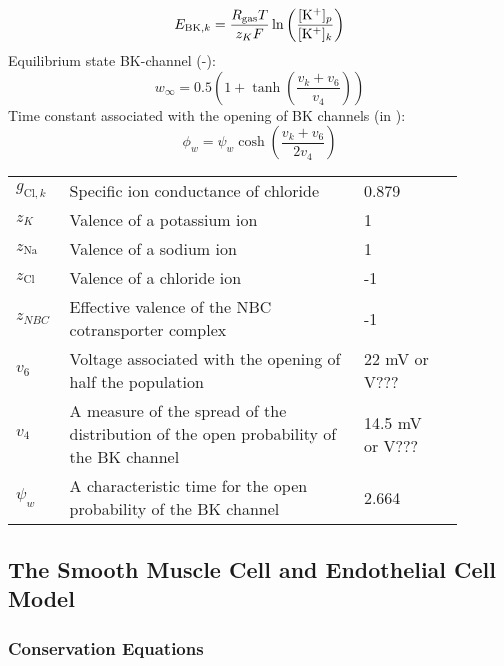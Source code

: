 \begin{equation} \label{eq:E_BK}
E_{\text{BK},k} = \frac{R_{\text{gas}} T}{z_K F}\ln\left( \frac{[\text{K$^+$}]_p}{[\text{K$^+$}]_k}\right) 
\end{equation}
%
Equilibrium state BK-channel (-): 
\begin{equation} \label{eq:winf}
w_{\infty} = 0.5 \left(1+\tanh\left(\frac{v_{k}+v_{6} }{v_{4}} \right)  \right) 
\end{equation}
%
Time constant associated with the opening of BK channels	 (in \pers):
\begin{equation} \label{eq:phin}
\phi_{w} = \psi_{w}\cosh\left( \frac{v_{k}+v_{6}}{2v_{4}}\right) 
\end{equation}

\begin{table}[h!]
\centering
\begin{tabular}{ p{0.09\linewidth}  >{\footnotesize} p{0.6\linewidth}  >{\footnotesize} p{0.17\linewidth} >{\footnotesize} p{0.03\linewidth} }
\hline
$g_{\text{Cl},k}$ 		& Specific ion conductance of chloride 									& 0.879 \perOhmm & \cite{Ostby2009}  \\
$z_K$			& Valence of a potassium ion										& 1   & \\ 
$z_{\text{Na}}$			& Valence of a sodium ion											& 1   & \\ 
$z_{\text{Cl}}$			& Valence of a chloride ion											& -1  & \\ 
$z_{NBC}$ 		& Effective valence of the NBC cotransporter complex 				& -1 & \\
$v_{6}$			& Voltage associated with the opening of half the population		& 22 mV or V???  & \cite{GonzalezFernandez1994}  \\
$v_{4}$			& A measure of the spread of the distribution of the open probability of the BK channel	& 14.5 mV or V???  &  \cite{GonzalezFernandez1994}  
\\
$ \psi_{w}$    	& A characteristic time for the open probability of the BK channel		& 2.664 \pers & \cite{GonzalezFernandez1994} \\
\hline
\end{tabular}
\end{table}

\subsection{The Smooth Muscle Cell and Endothelial Cell Model}\label{sec:EqSMCEC}

\subsubsection*{Conservation Equations}
